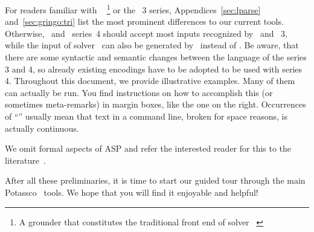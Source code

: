 
For readers familiar with \lparse~\cite{lparseManual}%
\footnote{A grounder that constitutes the traditional front end of solver \smodels~\cite{siniso02a}}
or the \gringo~3 series,
Appendices~\ref{sec:lparse} and~\ref{sec:gringo:tri}
list the most prominent differences to our current tools.
Otherwise, \gringo\ and \clingo\ series~4 should accept most inputs recognized by \lparse\ and \gringo~3,
while the input of solver \clasp\ can also be generated by \lparse\ instead of \gringo.
Be aware, that there are some syntactic and semantic changes between the language of the series 3 and 4,
so already existing encodings have to be adopted to be used with series 4.
Throughout this document, we provide illustrative examples.
Many of them can actually be run. 
You find instructions on how to accomplish this
(or sometimes meta-remarks)
in margin boxes, like the one on the right.
Occurrences of ``''
usually mean that text in a command line, broken for space reasons, is actually continuous.

We omit formal aspects of ASP and refer the interested reader for this to the literature~\cite{baral02a,gelkah14a,gekakasc12a}.

After all these preliminaries, it is time to start our guided tour
through the main Potassco~\cite{potassco} tools.
We hope that you will find it enjoyable and helpful!

